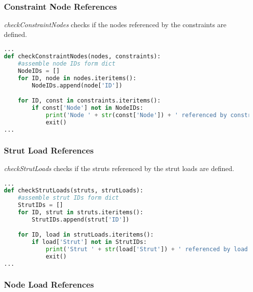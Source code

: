 \subsubsection{Constraint Node References}
\label{sec:inputcheck-checkConstraintNodes}

\textit{checkConstraintNodes} checks if the nodes referenced by the constraints are defined.

\begin{inconsolata}
\begin{minipage}{\linewidth}
\begin{lstlisting}[language=python]
...
def checkConstraintNodes(nodes, constraints):
    #assemble node IDs form dict
    NodeIDs = []
    for ID, node in nodes.iteritems():
        NodeIDs.append(node['ID'])

    for ID, const in constraints.iteritems():
        if const['Node'] not in NodeIDs:
            print('Node ' + str(const['Node']) + ' referenced by constraint ' + str(ID) + ' but not defined.')
            exit()
...
\end{lstlisting}
\end{minipage}
\end{inconsolata}

\subsubsection{Strut Load References}
\label{sec:inputcheck-checkStrutLoads}

\textit{checkStrutLoads} checks if the struts referenced by the strut loads are defined.

\begin{inconsolata}
\begin{minipage}{\linewidth}
\begin{lstlisting}[language=python]
...
def checkStrutLoads(struts, strutLoads):
    #assemble strut IDs form dict
    StrutIDs = []
    for ID, strut in struts.iteritems():
        StrutIDs.append(strut['ID'])

    for ID, load in strutLoads.iteritems():
        if load['Strut'] not in StrutIDs:
            print('Strut ' + str(load['Strut']) + ' referenced by load ' + str(ID) + ' but not defined.')
            exit()
...
\end{lstlisting}
\end{minipage}
\end{inconsolata}

\subsubsection{Node Load References}
\label{sec:inputcheck-checkNodeLoads}

